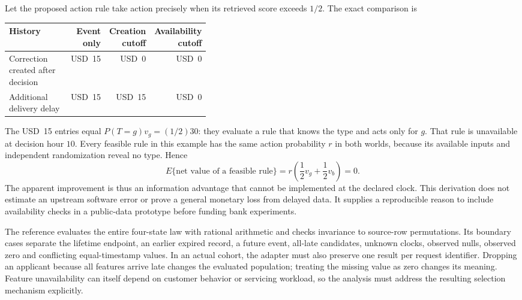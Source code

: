 Let the proposed action rule take action precisely when its retrieved score
exceeds $1/2$. The exact comparison is
\begin{center}
\begin{tabular}{p{0.39\linewidth}rrr}
\toprule
History & Event only & Creation cutoff & Availability cutoff\\
\midrule
Correction created after decision & USD~15 & USD~0 & USD~0\\
Additional delivery delay & USD~15 & USD~15 & USD~0\\
\bottomrule
\end{tabular}
\end{center}
The USD~15 entries equal $P(T=g)v_g=(1/2)30$: they evaluate a rule that knows
the type and acts only for $g$. That rule is unavailable at decision hour
$10$. Every feasible rule in this example has the same action probability
$r$ in both worlds, because its available inputs and independent
randomization reveal no type. Hence
\begin{equation}
 E\{\text{net value of a feasible rule}\}
 =r\left(\frac12v_g+\frac12v_b\right)=0.
 \label{exec19:feast-feasible}
\end{equation}
The apparent improvement is thus an information advantage that cannot be
implemented at the declared clock. This derivation does not estimate an
upstream software error or prove a general monetary loss from delayed data.
It supplies a reproducible reason to include availability checks in a
public-data prototype before funding bank experiments.\citep{exec19_feast_reference}

The reference evaluates the entire four-state law with rational arithmetic
and checks invariance to source-row permutations. Its boundary cases separate
the lifetime endpoint, an earlier expired record, a future event, all-late
candidates, unknown clocks, observed nulls, observed zero and conflicting
equal-timestamp values. In an actual cohort, the adapter must also preserve
one result per request identifier. Dropping an applicant because all features
arrive late changes the evaluated population; treating the missing value as
zero changes its meaning. Feature unavailability can itself depend on
customer behavior or servicing workload, so the analysis must address the
resulting selection mechanism explicitly.\citep{exec19_feast_reference}

